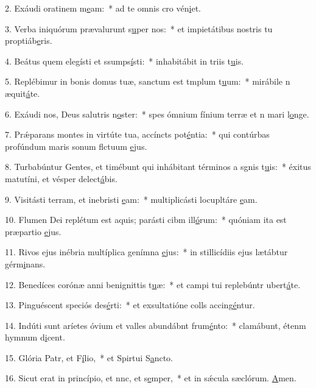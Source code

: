 2. Exáudi oratinem m\uline{e}am:~* ad te omnis cro vén\uline{i}et.\par 
3. Verba iniquórum prævalurunt s\uline{u}per nos:~* et impietátibus nostris tu proptiáb\uline{e}ris.\par 
4. Beátus quem elegísti et ssumps\uline{í}sti:~* inhabitábit in triis t\uline{u}is.\par 
5. Replébimur in bonis domus tuæ, sanctum est tmplum t\uline{u}um:~* mirábile n æquit\uline{á}te.\par 
6. Exáudi nos, Deus salutris n\uline{o}ster:~* spes ómnium fínium terræ et n mari l\uline{o}nge.\par 
7. Prǽparans montes in virtúte tua, accíncts pot\uline{é}ntia:~* qui contúrbas profúndum maris sonum flctuum \uline{e}jus.\par 
8. Turbabúntur Gentes, et timébunt qui inhábitant términos a sgnis t\uline{u}is:~* éxitus matutíni, et vésper delect\uline{á}bis.\par 
9. Visitásti terram, et inebristi \uline{e}am:~* multiplicásti locupltáre \uline{e}am.\par 
10. Flumen Dei replétum est aquis; parásti cibm ill\uline{ó}rum:~* quóniam ita est præpartio \uline{e}jus.\par 
11. Rivos ejus inébria multíplica genímna \uline{e}jus:~* in stillicídiis ejus lætábtur gérm\uline{i}nans.\par 
12. Benedíces corónæ anni benignittis t\uline{u}æ:~* et campi tui replebúntr ubert\uline{á}te.\par 
13. Pinguéscent speciós des\uline{é}rti:~* et exsultatióne colls accing\uline{é}ntur.\par 
14. Indúti sunt aríetes óvium et valles abundábnt frum\uline{é}nto:~* clamábunt, étenm hymnum d\uline{i}cent.\par 
15. Glória Patr, et F\uline{í}lio,~* et Spirtui S\uline{a}ncto.\par 
16. Sicut erat in princípio, et nnc, et s\uline{e}mper,~* et in sǽcula sæclórum. \uline{A}men.\par 
